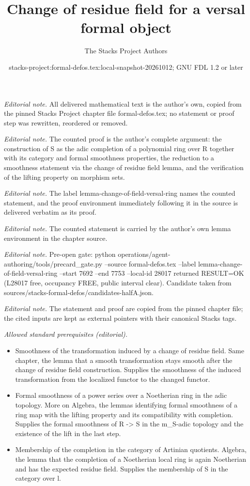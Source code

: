 \documentclass[10pt,a4paper]{amsart}
\title{Change of residue field for a versal formal object}
\author{The Stacks Project Authors}
\date{stacks-project:formal-defos.tex:local-snapshot-20261012; GNU FDL 1.2 or later}
\theoremstyle{plain}
\theoremstyle{definition}
\theoremstyle{remark}
\numberwithin{equation}{subsection}
\begin{document}
\maketitle
\noindent\textit{Editorial note.} All delivered mathematical text is the author's own, copied from the pinned Stacks Project chapter file formal-defos.tex; no statement or proof step was rewritten, reordered or removed.\par\medskip
\noindent\textit{Editorial note.} The counted proof is the author's complete argument: the construction of S as the adic completion of a polynomial ring over R together with its category and formal smoothness properties, the reduction to a smoothness statement via the change of residue field lemma, and the verification of the lifting property on morphism sets.\par\medskip
\noindent\textit{Editorial note.} The label lemma-change-of-field-versal-ring names the counted statement, and the proof environment immediately following it in the source is delivered verbatim as its proof.\par\medskip
\noindent\textit{Editorial note.} The counted statement is carried by the author's own lemma environment in the chapter source.\par\medskip
\noindent\textit{Editorial note.} Pre-open gate: python operations/agent-authoring/tools/precard\_gate.py --source formal-defos.tex --label lemma-change-of-field-versal-ring --start 7692 --end 7753 --local-id 28017 returned RESULT=OK (L28017 free, occupancy FREE, public interval clear). Candidate taken from sources/stacks-formal-defos/candidates-halfA.json.\par\medskip
\noindent\textit{Editorial note.} The statement and proof are copied from the pinned chapter file; the cited inputs are kept as external pointers with their canonical Stacks tags.\par\medskip
\noindent\textit{Allowed standard prerequisites (editorial).}\begin{itemize}
\item Smoothness of the transformation induced by a change of residue field. Same chapter, the lemma that a smooth transformation stays smooth after the change of residue field construction. Supplies the smoothness of the induced transformation from the localized functor to the changed functor.
\item Formal smoothness of a power series over a Noetherian ring in the adic topology. More on Algebra, the lemmas identifying formal smoothness of a ring map with the lifting property and its compatibility with completion. Supplies the formal smoothness of R -> S in the m\_S-adic topology and the existence of the lift in the last step.
\item Membership of the completion in the category of Artinian quotients. Algebra, the lemma that the completion of a Noetherian local ring is again Noetherian and has the expected residue field. Supplies the membership of S in the category over l.
\end{itemize}\medskip
\end{document}
